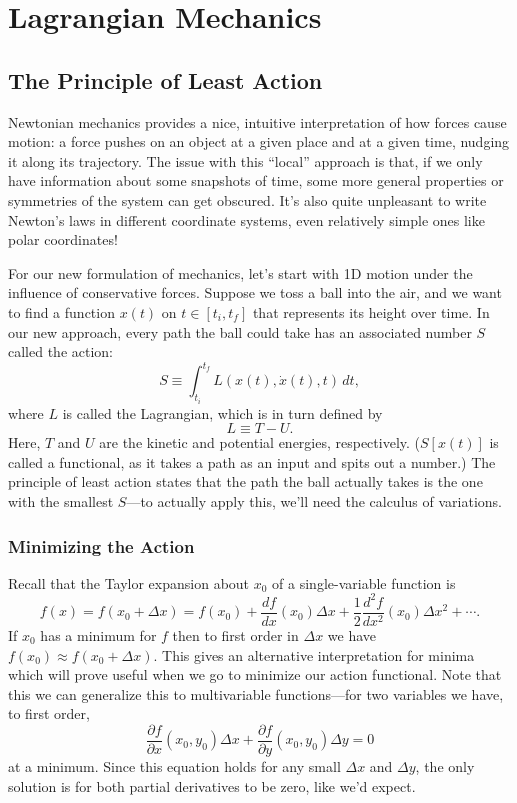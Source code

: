 \documentclass[../p111main.tex]{subfiles}
\begin{document}
\chapter{Lagrangian Mechanics}
\section{The Principle of Least Action}
Newtonian mechanics provides a nice, intuitive interpretation of how forces cause motion: a force pushes on an object at a given place and at a given time, nudging it along its trajectory.
The issue with this ``local'' approach is that, if we only have information about some snapshots of time, some more general properties or symmetries of the system can get obscured.
It's also quite unpleasant to write Newton's laws in different coordinate systems, even relatively simple ones like polar coordinates!

For our new formulation of mechanics, let's start with 1D motion under the influence of conservative forces.
Suppose we toss a ball into the air, and we want to find a function $x(t)$ on $t \in [t_i, t_f]$ that represents its height over time.
In our new approach, every path the ball could take has an associated number $S$ called the action:
\[ S \equiv \int_{t_i}^{t_f} L(x(t), \dot x(t), t) \,dt, \]
where $L$ is called the Lagrangian, which is in turn defined by
\[ L \equiv T - U. \]
Here, $T$ and $U$ are the kinetic and potential energies, respectively.
($S[x(t)]$ is called a functional, as it takes a path as an input and spits out a number.)
The principle of least action states that the path the ball actually takes is the one with the smallest $S$---to actually apply this, we'll need the calculus of variations.

\subsection*{Minimizing the Action}
Recall that the Taylor expansion about $x_0$ of a single-variable function is
\[ f(x) = f(x_0 + \Delta x) = f(x_0) + \frac{df}{dx}(x_0) \Delta x + \frac{1}{2} \frac{d^2f}{dx^2} (x_0) \Delta x^2 + \cdots. \]
If $x_0$ has a minimum for $f$ then to first order in $\Delta x$ we have $f(x_0) \approx f(x_0 + \Delta x)$.
This gives an alternative interpretation for minima which will prove useful when we go to minimize our action functional.
Note that this we can generalize this to multivariable functions---for two variables we have, to first order,
\[ \frac{\partial f}{\partial x} (x_0, y_0) \Delta x + \frac{\partial f}{\partial y} (x_0, y_0) \Delta y = 0 \]
at a minimum.
Since this equation holds for any small $\Delta x$ and $\Delta y$, the only solution is for both partial derivatives to be zero, like we'd expect.
\end{document}
